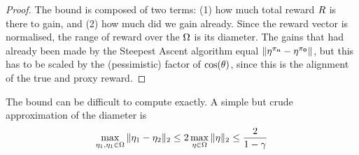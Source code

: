 \begin{proof}
The bound is composed of two terms: (1) how much total reward $R$ is there to gain, and (2) how much did we gain already. Since the reward vector is normalised, the range of reward over the $\Omega$ is its diameter. The gains that had already been made by the Steepest Ascent algorithm equal $\|\mathbf{\eta^{\pi_{n}}} - \mathbf{\eta^{\pi_{0}}}\|$, but this has to be scaled by the (pessimistic) factor of $\cos(\theta)$, since this is the alignment of the true and proxy reward.
\end{proof}

The bound can be difficult to compute exactly. A simple but crude approximation of the diameter is
\[
\max_{\eta_1,\eta_1 \in \Omega} \|\eta_1  - \eta_2\|_2 \leq 2 \max_{\eta \in \Omega} \|\eta\|_2 \leq \frac{2}{1 - \gamma}
\]